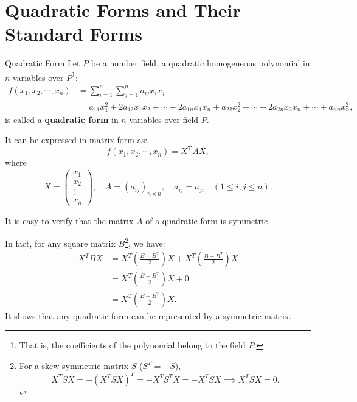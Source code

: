 \documentclass[11pt]{../../TexTemplate/elegantbook} %
\begin{document}
\section{Quadratic Forms and Their Standard Forms}
\begin{definition}{Quadratic Form}
    Let \(P\) be a number field, a quadratic homogeneous polynomial in \( n \) variables over \( P \)\footnote{
        That is, the coefficients of the polynomial belong to the field \( P \).
    }:
    \begin{align*}
        f( x_{1}, x_{2}, \cdots, x_{n}) &= \sum_{i=1}^{n} \sum_{j=1}^{n} a_{ij} x_{i} x_{j} \\
    &= a_{11}x_{1}^{2} + 2a_{12}x_{1}x_{2} + \cdots + 2a_{1n}x_{1}x_{n} + a_{22}x_{2}^{2} + \cdots + 2a_{2n}x_{2}x_{n} + \cdots + a_{nn}x_{n}^{2},
    \end{align*}
    is called a \textbf{quadratic form} in \( n \) variables over field \( P \).

    It can be expressed in matrix form as:
    \[
    f( x_{1}, x_{2}, \cdots, x_{n}) = X^{\mathrm{T}} A X,
    \]
    where 
    \[
    X = \begin{pmatrix}
        x_{1} \\
        x_{2} \\
        \vdots \\
        x_{n}
    \end{pmatrix}, \quad
    A = (a_{ij})_{n \times n}, \quad a_{ij} = a_{ji} \quad (1 \leqslant i, j \leqslant n).
    \]
\end{definition}
It is easy to verify that the matrix \( A \) of a quadratic form is symmetric.
\begin{note}
    In fact, for any square matrix \( B \)\footnote{
        For a skew-symmetric matrix \( S \) (\( S^{T} = -S \)),
        \[
        X^{T} S X = - (X^{T} S X)^{T} = - X^{T} S^{T} X = - X^{T} S X \implies X^{T} S X = 0.
        \]
    }, we have:
    \begin{align*}
        X^{T}BX &= X^{T}\left( \frac{B + B^{T}}{2} \right)X + X^{T}\left( \frac{B - B^{T}}{2} \right)X \\
        &= X^{T}\left( \frac{B + B^{T}}{2} \right)X + 0 \\
        &= X^{T}\left( \frac{B + B^{T}}{2} \right)X.
    \end{align*}
    It shows that any quadratic form can be represented by a symmetric matrix.
\end{note}
\end{document}

